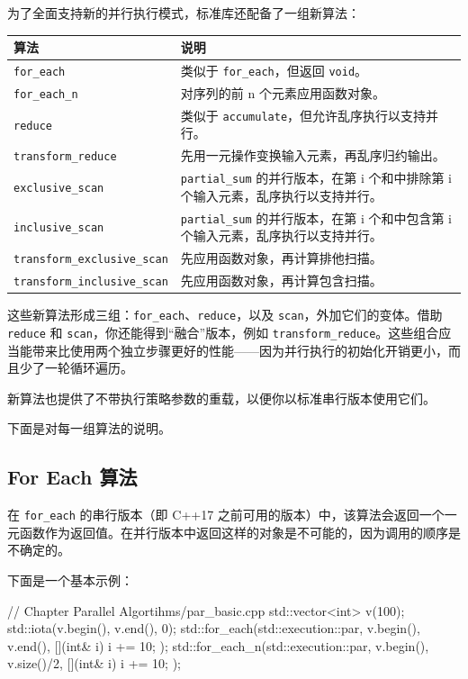 为了全面支持新的并行执行模式，标准库还配备了一组新算法：

\begin{table}[H]
\centering
\begin{tabularx}{\textwidth}{X X}
\toprule
算法 & 说明 \\
\midrule
\texttt{for\_each} & 类似于 \texttt{for\_each}，但返回 \texttt{void}。 \\
\texttt{for\_each\_n} & 对序列的前 n 个元素应用函数对象。 \\
\texttt{reduce} & 类似于 \texttt{accumulate}，但允许乱序执行以支持并行。 \\
\texttt{transform\_reduce} & 先用一元操作变换输入元素，再乱序归约输出。 \\
\texttt{exclusive\_scan} & \texttt{partial\_sum} 的并行版本，在第 i 个和中排除第 i 个输入元素，乱序执行以支持并行。 \\
\texttt{inclusive\_scan} & \texttt{partial\_sum} 的并行版本，在第 i 个和中包含第 i 个输入元素，乱序执行以支持并行。 \\
\texttt{transform\_exclusive\_scan} & 先应用函数对象，再计算排他扫描。 \\
\texttt{transform\_inclusive\_scan} & 先应用函数对象，再计算包含扫描。 \\
\bottomrule
\end{tabularx}
\end{table}

这些新算法形成三组：\texttt{for\_each}、\texttt{reduce}，以及 \texttt{scan}，外加它们的变体。借助 \texttt{reduce} 和 \texttt{scan}，你还能得到“融合”版本，例如 \texttt{transform\_reduce}。这些组合应当能带来比使用两个独立步骤更好的性能——因为并行执行的初始化开销更小，而且少了一轮循环遍历。

新算法也提供了不带执行策略参数的重载，以便你以标准串行版本使用它们。

下面是对每一组算法的说明。


\subsection{For Each 算法}

在 \texttt{for\_each} 的串行版本（即 C++17 之前可用的版本）中，该算法会返回一个一元函数作为返回值。在并行版本中返回这样的对象是不可能的，因为调用的顺序是不确定的。

下面是一个基本示例：

\begin{codebox}[cpp]
// Chapter Parallel Algortihms/par_basic.cpp
std::vector<int> v(100);
std::iota(v.begin(), v.end(), 0);
std::for_each(std::execution::par, v.begin(), v.end(),
[](int& i) { i += 10; });
std::for_each_n(std::execution::par, v.begin(), v.size()/2,
[](int& i) { i += 10; });
\end{codebox}

